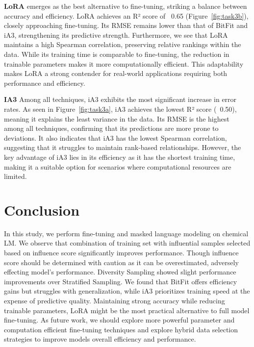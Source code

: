 \documentclass[11pt]{article}
\begin{document}
\textbf{LoRA} emerges as the best alternative to fine-tuning, striking a balance between accuracy and efficiency. LoRA achieves an R² score of ~0.65 (Figure~\ref{fig:task3b}), closely approaching fine-tuning. Its RMSE remains lower than that of BitFit and iA3, strengthening its predictive strength. Furthermore, we see that LoRA maintains a high Spearman correlation, preserving relative rankings within the data. While its training time is comparable to fine-tuning, the reduction in trainable parameters makes it more computationally efficient. This adaptability makes LoRA a strong contender for real-world applications requiring both performance and efficiency.

\textbf{IA3} Among all techniques, iA3 exhibits the most significant increase in error rates. As seen in Figure~\ref{fig:task3a}, iA3 achieves the lowest R² score (~0.50), meaning it explains the least variance in the data. Its RMSE is the highest among all techniques, confirming that its predictions are more prone to deviations. It also indicates that iA3 has the lowest Spearman correlation, suggesting that it struggles to maintain rank-based relationships. However, the key advantage of iA3 lies in its efficiency as it has the shortest training time, making it a suitable option for scenarios where computational resources are limited.

\section*{Conclusion} 

In this study, we perform fine-tuning and masked language modeling on chemical LM. We observe that combination of training set with influential samples selected based on influence score significantly improves performance. Though influence score should be determined with caution as it can be overestimated, adversely effecting model's performance. Diversity Sampling showed slight performance improvements over Stratified Sampling. We found that BitFit offers efficiency gains but struggles with generalization, while iA3 prioritizes training speed at the expense of predictive quality.  Maintaining strong accuracy while reducing trainable  parameters, LoRA might be the most practical alternative to full model fine-tuning. As future work, we should explore more powerful parameter and computation efficient fine-tuning techniques and explore hybrid data selection strategies to improve models overall efficiency and performance. 
 

% 
% 


% 
% 


\end{document}
